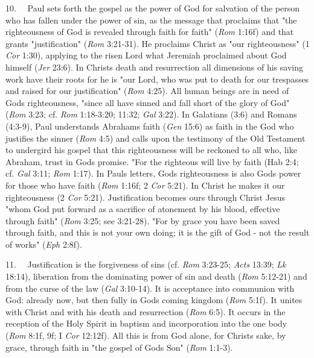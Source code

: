 10.~ ~Paul sets forth the gospel as the power of God for salvation of
the person who has fallen under the power of sin, as the message that
proclaims that "the righteousness of God is revealed through faith for
faith" (\emph{Rom} 1:16f) and that grants "justification" (\emph{Rom}
3:21-31). He proclaims Christ as "our righteousness" (1 \emph{Cor}
1:30), applying to the risen Lord what Jeremiah proclaimed about God
himself (\emph{Jer} 23:6). In Christ\textquotesingle s death and
resurrection all dimensions of his saving work have their roots for he
is "our Lord, who was put to death for our trespasses and raised for our
justification" (\emph{Rom} 4:25). All human beings are in need of
God\textquotesingle s righteousness, "since all have sinned and fall
short of the glory of God" (\emph{Rom} 3:23; cf. \emph{Rom} 1:18-3:20;
11:32; \emph{Gal} 3:22). In Galatians (3:6) and Romans (4:3-9), Paul
understands Abraham\textquotesingle s faith (\emph{Gen} 15:6) as faith
in the God who justifies the sinner (\emph{Rom} 4:5) and calls upon the
testimony of the Old Testament to undergird his gospel that this
righteousness will be reckoned to all who, like Abraham, trust in
God\textquotesingle s promise. "For the righteous will live by faith
(Hab 2:4; cf. \emph{Gal} 3:11; \emph{Rom} 1:17). In
Paul\textquotesingle s letters, God\textquotesingle s righteousness is
also God\textquotesingle s power for those who have faith (\emph{Rom}
1:16f; 2 \emph{Cor} 5:21). In Christ he makes it our righteousness (2
\emph{Cor} 5:21). Justification becomes ours through Christ Jesus "whom
God put forward as a sacrifice of atonement by his blood, effective
through faith" (\emph{Rom} 3:25; see 3:21-28). "For by grace you have
been saved through faith, and this is not your own doing; it is the gift
of God - not the result of works" (\emph{Eph} 2:8f).

11.~ ~Justification is the forgiveness of sins (cf. \emph{Rom} 3:23-25;
\emph{Acts} 13:39; \emph{Lk} 18:14), liberation from the dominating
power of sin and death (\emph{Rom} 5:12-21) and from the curse of the
law (\emph{Gal} 3:10-14). It is acceptance into communion with God:
already now, but then fully in God\textquotesingle s coming kingdom
(\emph{Rom} 5:1f). It unites with Christ and with his death and
resurrection (\emph{Rom} 6:5). It occurs in the reception of the Holy
Spirit in baptism and incorporation into the one body (\emph{Rom} 8:1f,
9f; I \emph{Cor} 12:12f). All this is from God alone, for
Christ\textquotesingle s sake, by grace, through faith in "the gospel of
God\textquotesingle s Son" (\emph{Rom} 1:1-3).

